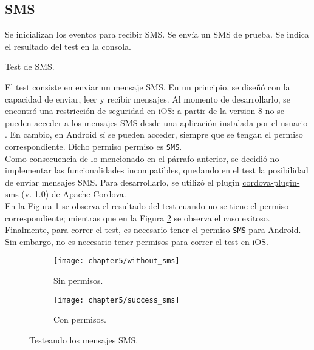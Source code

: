 \subsection{SMS}
\begin{algorithm}
	\begin{algorithmic}[1]
		\STATE Se inicializan los eventos para recibir SMS. 
		\STATE Se envía un SMS de prueba.
		\STATE Se indica el resultado del test en la consola.
	\end{algorithmic}
	\caption{Test de SMS.}
	\label{alg:chap5_test_sms}
\end{algorithm}
El test consiste en enviar un mensaje SMS. En un principio, se diseñó con la capacidad de enviar, leer y recibir mensajes. Al momento de desarrollarlo, se encontró una restricción de seguridad en iOS: a partir de la version 8 no se pueden acceder a los mensajes SMS desde una aplicación instalada por el usuario \cite{foda, foda2}. En cambio, en Android sí se pueden acceder, siempre que se tengan el permiso correspondiente. Dicho permiso permiso es \texttt{SMS}.\\
Como consecuencia de lo mencionado en el párrafo anterior, se decidió no implementar las funcionalidades incompatibles, quedando en el test la posibilidad de enviar mensajes SMS. Para desarrollarlo, se utilizó el plugin \href{https://github.com/floatinghotpot/cordova-plugin-sms}{cordova-plugin-sms (v. 1.0)} de Apache Cordova.\\
En la Figura \ref{fig:ch05:without_sms} se observa el resultado del test cuando no se tiene el permiso correspondiente; mientras que en la Figura \ref{fig:ch05:with_sms} se observa el caso exitoso.\\
Finalmente, para correr el test, es necesario tener el permiso \texttt{SMS} para Android. Sin embargo, no es necesario tener permisos para correr el test en iOS.
\begin{figure}[hbtp]
    \centering
	\begin{subfigure}{.3\linewidth}
		\texttt{[image: chapter5/without\_sms]}
		\caption{Sin permisos.}
		\label{fig:ch05:without_sms}
	\end{subfigure}
	\begin{subfigure}{.3\linewidth}
	    \centering
		\texttt{[image: chapter5/success\_sms]}
		\caption{Con permisos.}
		\label{fig:ch05:with_sms}
	\end{subfigure}
	\caption{Testeando los mensajes SMS.}
	\label{fig:chapter05:sms_test}
\end{figure}
